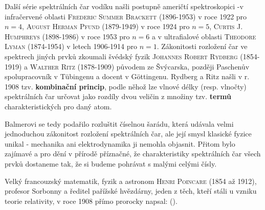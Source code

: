         
        Další série spektrálních čar vodíku našli postupně američtí spektroskopici -v infračervené
        oblasti \textsc{Frederic Summer Brackett} (1896-1953) v roce 1922 pro \(n = 4\),
        \textsc{August Herman Pfund} (1879-1949) v roce 1924 pro \(n = 5\), \textsc{Curtis J.
        Humphreys} (1898-1986) v roce 1953 pro \(n = 6\) a v ultrafialové oblasti \textsc{Theodore
        Lyman} (1874-1954) v letech 1906-1914 pro \(n =1\). Zákonitosti rozložení čar ve spektrech
        jiných prvků zkoumali švédský fyzik \textsc{Johannes Robert Rydberg} (1854-1919) a
        \textsc{Walther Ritz} (1878-1909) původem ze Švýcarska, později Paschenův spolupracovník v
        Tübingenu a docent v Göttingenu. Rydberg a Ritz našli v r. 1908 tzv. \textbf{kombinační
        princip}, podle něhož lze vlnové délky (resp. vlnočty) spektrálních čar určovat jako rozdíly
        dvou veličin z množiny tzv. \textbf{termů} charakteristických pro daný atom.

        Balmerovi se tedy podařilo rozluštit číselnou šarádu, která udávala velmi jednoduchou
        zákonitost rozložení spektrálních čar, ale její smysl klasické fyzice unikal - mechanika ani
        elektrodynamika ji nemohla objasnit. Přitom bylo zajímavé a pro dění v přírodě příznačné, že
        charakteristiky spektrálních čar všech prvků dostaneme tak, že si budeme pohrávat s malými
        celými čísly.
      
      Velký francouzský matematik, fyzik a astronom \textsc{Henri Poincare} (1854 až 1912), profesor
      Sorbonny a ředitel pařížské hvězdárny, jeden z těch, kteří stáli u vzniku teorie relativity, v
      roce 1908 přímo prorocky napsal: \emph{} ().

